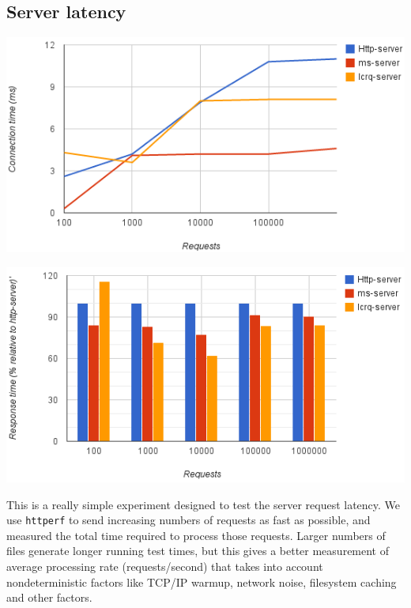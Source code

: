 \documentclass[twoside,10pt]{article}
\newenvironment{Figure}
  {\par\medskip\noindent\minipage{\linewidth}}
  {\endminipage\par\medskip}
\begin{document}
\begin{multicols}{2}
\subsection{Server latency}

\begin{Figure}
\includegraphics[width=\linewidth]{img/max-latency.png}
\end{Figure}
\begin{Figure}
\includegraphics[width=\linewidth]{img/requests-vs-connection-time.png}
\end{Figure}


This is a really simple experiment designed to test the server request
latency. We use \verb+httperf+ to send increasing numbers of requests
as fast as possible, and measured the total time required to process
those requests. Larger numbers of files generate longer running test
times, but this gives a better measurement of average processing rate
(requests/second) that takes into account nondeterministic factors
like TCP/IP warmup, network noise, filesystem caching and other factors.


\end{multicols}
\end{document}

